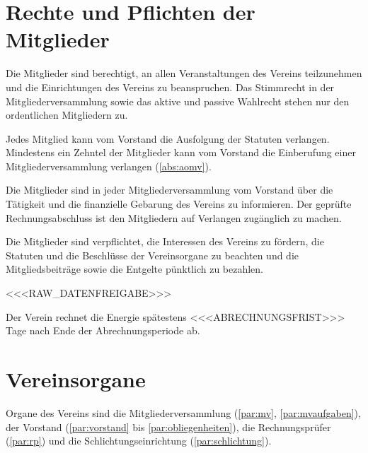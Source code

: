 \documentclass[a4paper,11pt]{article}
\begin{document}
\section{Rechte und Pflichten der Mitglieder}\label{par:rechte}
\begin{absaetze}
  \item Die Mitglieder sind berechtigt, an allen Veranstaltungen des Vereins teilzunehmen und die Einrichtungen des
        Vereins zu beanspruchen. Das Stimmrecht in der Mitgliederversammlung sowie das aktive und passive Wahlrecht
        stehen nur den ordentlichen Mitgliedern zu.
  \item Jedes Mitglied kann vom Vorstand die Ausfolgung der Statuten verlangen. Mindestens ein Zehntel der Mitglieder
        kann vom Vorstand die Einberufung einer Mitgliederversammlung verlangen (\ref{abs:aomv}).
  \item Die Mitglieder sind in jeder Mitgliederversammlung vom Vorstand über die Tätigkeit und die finanzielle
        Gebarung des Vereins zu informieren. Der geprüfte Rechnungsabschluss ist den Mitgliedern auf Verlangen
        zugänglich zu machen.
  \item Die Mitglieder sind verpflichtet, die Interessen des Vereins zu fördern, die Statuten und die Beschlüsse der
        Vereinsorgane zu beachten und die Mitgliedsbeiträge sowie die Entgelte pünktlich zu bezahlen.
  \item <<<RAW_DATENFREIGABE>>>
  \item Der Verein rechnet die Energie spätestens <<<ABRECHNUNGSFRIST>>> Tage nach Ende der Abrechnungsperiode ab.
\end{absaetze}

\section{Vereinsorgane}\label{par:organe}
Organe des Vereins sind die Mitgliederversammlung (\ref{par:mv}, \ref{par:mvaufgaben}), der Vorstand
(\ref{par:vorstand} bis \ref{par:obliegenheiten}), die Rechnungsprüfer (\ref{par:rp}) und die Schlichtungseinrichtung
(\ref{par:schlichtung}).

\end{document}

